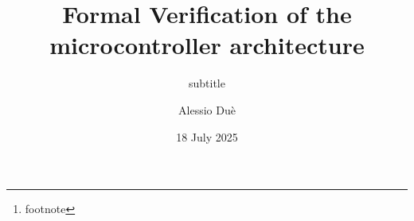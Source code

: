 



\listfiles





\titlehead{
  {\Large Università di Pisa \hfill A.Y.~2024--2025} \\
  {\large Dipartimento di Informatica}
}
\subject{Master's Thesis in Computer Science}
\title{Formal Verification of the \msp microcontroller architecture}
\subtitle{subtitle }
\author{Alessio Duè}
\date{18 July 2025}
\publishers{relatori...\thanks{footnote}}


\maketitle %
\tableofcontents

\mainmatter






\backmatter
\printbibliography[heading=bibintoc]


